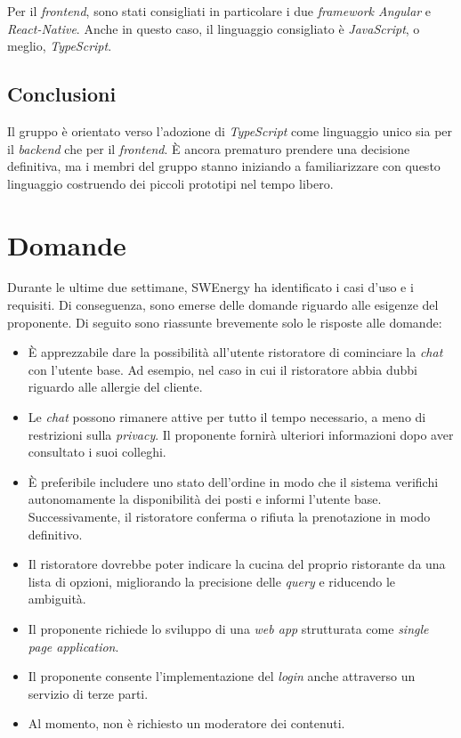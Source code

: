 Per il \textit{frontend}, sono stati consigliati in particolare i due
\textit{framework Angular} e \textit{React-Native}. Anche in questo caso, il
linguaggio consigliato è \textit{JavaScript}, o meglio, \textit{TypeScript}.

\subsection{Conclusioni}

Il gruppo è orientato verso l'adozione di \textit{TypeScript} come linguaggio
unico sia per il \textit{backend} che per il \textit{frontend}. È ancora 
prematuro prendere una decisione definitiva, ma i membri del gruppo
stanno iniziando a familiarizzare con questo linguaggio costruendo dei
piccoli prototipi nel tempo libero.

\section{Domande}

Durante le ultime due settimane, SWEnergy ha identificato i casi d'uso e i
requisiti. Di conseguenza, sono emerse delle domande riguardo alle esigenze
del proponente. Di seguito sono riassunte brevemente solo le risposte alle
domande:

\begin{itemize}
	\item È apprezzabile dare la possibilità all'utente ristoratore di
	      cominciare la \textit{chat} con l'utente base. Ad esempio, nel caso in cui il
	      ristoratore abbia dubbi riguardo alle allergie del cliente.

	\item Le \textit{chat} possono rimanere attive per tutto il tempo necessario, a meno
	      di restrizioni sulla \textit{privacy}. Il proponente fornirà ulteriori
	      informazioni dopo aver consultato i suoi colleghi.

	\item È preferibile includere uno stato dell'ordine in modo che il sistema
	      verifichi autonomamente la disponibilità dei posti e informi l'utente
	      base. Successivamente, il ristoratore conferma o rifiuta la
	      prenotazione in modo definitivo.

	\item Il ristoratore dovrebbe poter indicare la cucina del proprio
	      ristorante da una lista di opzioni, migliorando la precisione delle
	      \textit{query} e riducendo le ambiguità.

	\item Il proponente richiede lo sviluppo di una \textit{web app}
	      strutturata come \textit{single page application}.

	\item Il proponente consente l'implementazione del \textit{login} anche
	      attraverso un servizio di terze parti.

	\item Al momento, non è richiesto un moderatore dei contenuti.
\end{itemize}

